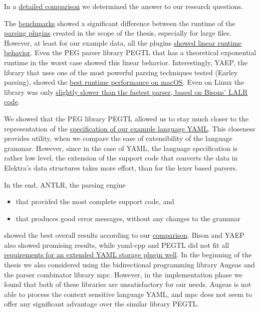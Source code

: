 In a \hyperref[sec:comparison]{detailed comparison} we determined the answer to our research questions.

\speed*

The \hyperref[sec:run_time_performance]{benchmarks} showed a significant difference between the runtime of the \hyperref[sec:implementation]{parsing plugins} created in the scope of the thesis, especially for large files. However, at least for our example data, all the plugins \hyperref[fig:benchmark_results_generated_above_1000]{showed linear runtime behavior}. Even the PEG parser library \gls{PEGTL} that has a theoretical exponential runtime in the worst case showed this linear behavior. Interestingly, \gls{YAEP}, the library that uses one of the most powerful parsing techniques tested (Earley parsing), showed the \hyperref[fig:benchmark_generated]{best runtime performance on macOS}. Even on Linux the library was only \hyperref[fig:benchmark_generated]{slightly slower than the fastest parser, based on Bisons’ LALR code}.

\closeness*

We showed that the \gls{PEG} library \gls{PEGTL} allowed us to stay much closer to the representation of the \href{http://yaml.org/spec/1.2/spec.html}{specification of our example language YAML}. This closeness provides utility, when we compare the ease of extensibility of the language grammar. However, since in the case of YAML, the language specification is rather low level, the extension of the support code that converts the data in Elektra’s data structures takes more effort, than for the lexer based parsers.

In the end, \gls{ANTLR}, the parsing engine

\begin{itemize}
  \item that provided the most complete support code, and
  \item that produces good error messages, without any changes to the grammar
\end{itemize}

showed the best overall results according to our \hyperref[sec:comparison]{comparison}. Bison and \gls{YAEP} also showed promising results, while yaml-cpp and PEGTL did not fit all \hyperref[sec:requirements_extended_yaml_plugin]{requirements for an extended YAML storage plugin well}. In the beginning of the thesis we also considered using the bidirectional programming library Augeas and the parser combinator library mpc. However, in the implementation phase we found that both of these libraries are unsatisfactory for our needs. Augeas is not able to process the context sensitive language YAML, and mpc does not seem to offer any significant advantage over the similar library \gls{PEGTL}.

